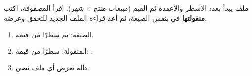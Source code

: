 \begin{statement}
ملف  يبدأ بعدد الأسطر والأعمدة ثم القيم (مبيعات منتج × شهر). اقرأ المصفوفة، اكتب \textbf{منقولتها} في  بنفس الصيغة، ثم أعد قراءة الملف الجديد للتحقق وعرضه.
\end{statement}
\begin{stepsbox}\begin{enumerate}
\item الصيغة:  ثم  سطرًا من  قيمة.
\item المنقولة:  سطرًا من  قيمة: .
\item دالة  تعرض أي ملف نصي.
\end{enumerate}\end{stepsbox}
